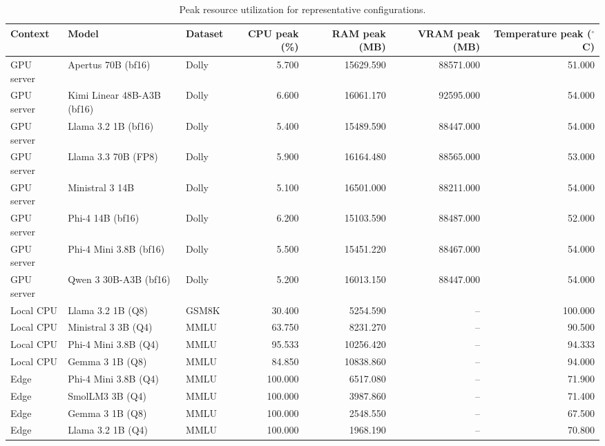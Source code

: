 \begin{table}[t]
\centering
\caption{Peak resource utilization for representative configurations.}
\label{tab:peak-resources}
\scriptsize
\setlength{\tabcolsep}{3.2pt}
\renewcommand{\arraystretch}{1.08}
\begin{tabularx}{\textwidth}{@{}lLLrrrr@{}}
\toprule
\textbf{Context} & \textbf{Model} & \textbf{Dataset} & \textbf{CPU peak (\%)} & \textbf{RAM peak (MB)} & \textbf{VRAM peak (MB)} & \textbf{Temperature peak ($^\circ$C)} \\
\midrule
GPU server & Apertus 70B (bf16) & Dolly & 5.700 & 15629.590 & 88571.000 & 51.000 \\
GPU server & Kimi Linear 48B-A3B (bf16) & Dolly & 6.600 & 16061.170 & 92595.000 & 54.000 \\
GPU server & Llama 3.2 1B (bf16) & Dolly & 5.400 & 15489.590 & 88447.000 & 54.000 \\
GPU server & Llama 3.3 70B (FP8) & Dolly & 5.900 & 16164.480 & 88565.000 & 53.000 \\
GPU server & Ministral 3 14B & Dolly & 5.100 & 16501.000 & 88211.000 & 54.000 \\
GPU server & Phi-4 14B (bf16) & Dolly & 6.200 & 15103.590 & 88487.000 & 52.000 \\
GPU server & Phi-4 Mini 3.8B (bf16) & Dolly & 5.500 & 15451.220 & 88467.000 & 54.000 \\
GPU server & Qwen 3 30B-A3B (bf16) & Dolly & 5.200 & 16013.150 & 88447.000 & 54.000 \\
Local CPU & Llama 3.2 1B (Q8) & GSM8K & 30.400 & 5254.590 & -- & 100.000 \\
Local CPU & Ministral 3 3B (Q4) & MMLU & 63.750 & 8231.270 & -- & 90.500 \\
Local CPU & Phi-4 Mini 3.8B (Q4) & MMLU & 95.533 & 10256.420 & -- & 94.333 \\
Local CPU & Gemma 3 1B (Q8) & MMLU & 84.850 & 10838.860 & -- & 94.000 \\
Edge & Phi-4 Mini 3.8B (Q4) & MMLU & 100.000 & 6517.080 & -- & 71.900 \\
Edge & SmolLM3 3B (Q4) & MMLU & 100.000 & 3987.860 & -- & 71.400 \\
Edge & Gemma 3 1B (Q8) & MMLU & 100.000 & 2548.550 & -- & 67.500 \\
Edge & Llama 3.2 1B (Q4) & MMLU & 100.000 & 1968.190 & -- & 70.800 \\
\bottomrule
\end{tabularx}
\end{table}

